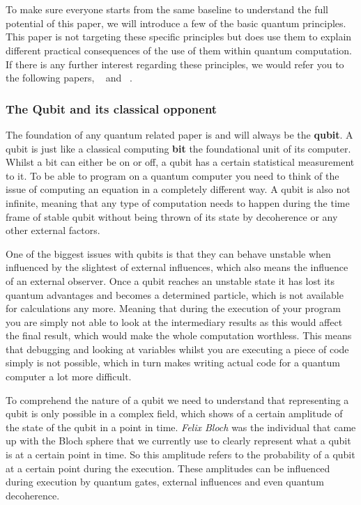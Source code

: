 \chapter{}
\label{ch:quantum-essentials}

To make sure everyone starts from the same baseline to understand the full potential of this paper, we will introduce a few of the basic quantum principles. This paper is not targeting these specific principles but does use them to explain different practical consequences of the use of them within quantum computation. If there is any further interest regarding these principles, we would refer you to the following papers, ~\textcite{Rieffel1998} and ~\textcite{Shor2000}.

\subsection{The Qubit and its classical opponent}

The foundation of any quantum related paper is and will always be the \textbf{qubit}. A qubit is just like a classical computing \textbf{bit} the foundational unit of its computer. Whilst a bit can either be on or off, a qubit has a certain statistical measurement to it. To be able to program on a quantum computer you need to think of the issue of computing an equation in a completely different way. A qubit is also not infinite, meaning that any type of computation needs to happen during the time frame of stable qubit without being thrown of its state by decoherence or any other external factors. 

One of the biggest issues with qubits is that they can behave unstable when influenced by the slightest of external influences, which also means the influence of an external observer. Once a qubit reaches an unstable state it has lost its quantum advantages and becomes a determined particle, which is not available for calculations any more. Meaning that during the execution of your program you are simply not able to look at the intermediary results as this would affect the final result, which would make the whole computation worthless. This means that debugging and looking at variables whilst you are executing a piece of code simply is not possible, which in turn makes writing actual code for a quantum computer a lot more difficult. 

To comprehend the nature of a qubit we need to understand that representing a qubit is only possible in a complex field, which shows of a certain amplitude of the state of the qubit in a point in time. \textit{Felix Bloch} was the individual that came up with the Bloch sphere that we currently use to clearly represent what a qubit is at a certain point in time.
So this amplitude refers to the probability of a qubit at a certain point during the execution. These amplitudes can be influenced during execution by quantum gates, external influences and even quantum decoherence.

